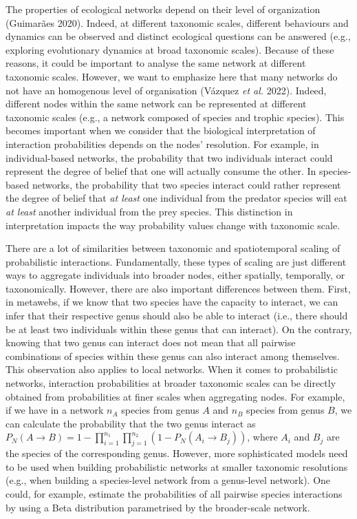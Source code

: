 \documentclass[10pt,oneside]{article}
\begin{document}
The properties of ecological networks depend on their level of
organization (Guimarães 2020). Indeed, at different taxonomic scales,
different behaviours and dynamics can be observed and distinct
ecological questions can be answered (e.g., exploring evolutionary
dynamics at broad taxonomic scales). Because of these reasons, it could
be important to analyse the same network at different taxonomic scales.
However, we want to emphasize here that many networks do not have an
homogenous level of organisation (Vázquez \emph{et al.} 2022). Indeed,
different nodes within the same network can be represented at different
taxonomic scales (e.g., a network composed of species and trophic
species). This becomes important when we consider that the biological
interpretation of interaction probabilities depends on the nodes'
resolution. For example, in individual-based networks, the probability
that two individuals interact could represent the degree of belief that
one will actually consume the other. In species-based networks, the
probability that two species interact could rather represent the degree
of belief that \emph{at least} one individual from the predator species
will eat \emph{at least} another individual from the prey species. This
distinction in interpretation impacts the way probability values change
with taxonomic scale.

There are a lot of similarities between taxonomic and spatiotemporal
scaling of probabilistic interactions. Fundamentally, these types of
scaling are just different ways to aggregate individuals into broader
nodes, either spatially, temporally, or taxonomically. However, there
are also important differences between them. First, in metawebs, if we
know that two species have the capacity to interact, we can infer that
their respective genus should also be able to interact (i.e., there
should be at least two individuals within these genus that can
interact). On the contrary, knowing that two genus can interact does not
mean that all pairwise combinations of species within these genus can
also interact among themselves. This observation also applies to local
networks. When it comes to probabilistic networks, interaction
probabilities at broader taxonomic scales can be directly obtained from
probabilities at finer scales when aggregating nodes. For example, if we
have in a network \(n_A\) species from genus \(A\) and \(n_B\) species
from genus \(B\), we can calculate the probability that the two genus
interact as
\(P_N(A \rightarrow B) = 1 - \prod_{i = 1}^{n_1}\prod_{j = 1}^{n_2}(1 - P_N(A_i \rightarrow B_j))\),
where \(A_i\) and \(B_j\) are the species of the corresponding genus.
However, more sophisticated models need to be used when building
probabilistic networks at smaller taxonomic resolutions (e.g., when
building a species-level network from a genus-level network). One could,
for example, estimate the probabilities of all pairwise species
interactions by using a Beta distribution parametrised by the
broader-scale network.
\end{document}
